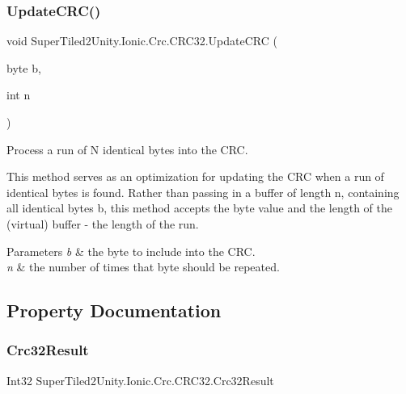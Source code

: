 \subsubsection{\texorpdfstring{Update\+C\+R\+C()}{UpdateCRC()}\hspace{0.1cm}{\footnotesize\ttfamily [2/2]}}
{\footnotesize\ttfamily void Super\+Tiled2\+Unity.\+Ionic.\+Crc.\+C\+R\+C32.\+Update\+C\+RC (\begin{DoxyParamCaption}\item[{byte}]{b,  }\item[{int}]{n }\end{DoxyParamCaption})}



Process a run of N identical bytes into the C\+RC. 

This method serves as an optimization for updating the C\+RC when a run of identical bytes is found. Rather than passing in a buffer of length n, containing all identical bytes b, this method accepts the byte value and the length of the (virtual) buffer -\/ the length of the run. 


\begin{DoxyParams}{Parameters}
{\em b} & the byte to include into the C\+RC. \\
\hline
{\em n} & the number of times that byte should be repeated. \\
\hline
\end{DoxyParams}


\subsection{Property Documentation}
\mbox{\label{class_super_tiled2_unity_1_1_ionic_1_1_crc_1_1_c_r_c32_ac401eaaaa2cbfcceabfa4f42146739e0}} 
\subsubsection{\texorpdfstring{Crc32\+Result}{Crc32Result}}
{\footnotesize\ttfamily Int32 Super\+Tiled2\+Unity.\+Ionic.\+Crc.\+C\+R\+C32.\+Crc32\+Result\hspace{0.3cm}{\ttfamily [get]}}



